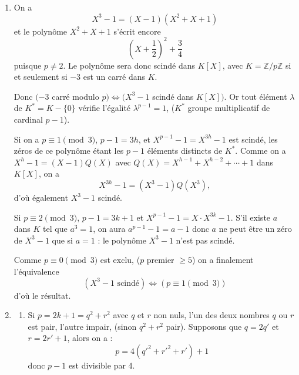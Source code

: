 \begin{enumerate}[label=\arabic*.,leftmargin=2.2em,itemsep=1.15em]
Soit $f\in I$. Si $f$ ne s'annule pas, la fonction $g=1/f$ est continue sur $[0,1]$, donc $1/f\in E$, $f\in I\Rightarrow1\in I$ et alors, $\forall g\in E$, $g=1\cdot g\in I$, c'est exclu. Donc chaque $f$ de $I$ s'annule. Soit
\[
N(f)=\{x\in[0,1],f(x)=0\}.
\]
Soient $f_1,\ldots,f_p$ dans $I$, les fonctions conjuguées $\overline{f_k}$ sont dans $E$ donc les produits $\overline{f_k}f_k=|f_k|^2$ sont dans l'idéal $I$ et les sommes
\[
\sum_{k=1}^p|f_k|^2
\]
sont dans $I$, donc $\sum_{k=1}^p|f_k|^2$ s'annule mais ceci n'est possible qu'en un $x_0$ zéro commun de $f_1,\ldots,f_p$. Donc, pour toute partie finie de $I$, les fonctions de cette partie ont un zéro commun.

Soit alors
\[
A=\bigcap_{f\in I}N(f).
\]
Si $A=\varnothing$, on a une intersection de fermés, ($f$ continue), vide, dans $[0,1]$ compact, donc il existe une intersection finie déjà vide, soit une famille finie d'éléments de $I$ sans zéro commun : c'est exclu.

Donc $\bigcap_{f\in I}N(f)\ne\varnothing$ : il y a un zéro commun aux $f$ de $I$.

\item On a
\[
X^3-1=(X-1)(X^2+X+1)
\]
et le polynôme $X^2+X+1$ s'écrit encore
\[
\left(X+\frac12\right)^2+\frac34
\]
puisque $p\ne2$. Le polynôme sera donc scindé dans $K[X]$, avec $K=\mathbb Z/p\mathbb Z$ si et seulement si $-3$ est un carré dans $K$.

Donc $(-3$ carré modulo $p)\Longleftrightarrow(X^3-1$ scindé dans $K[X])$. Or tout élément $\lambda$ de $K^*=K-\{0\}$ vérifie l'égalité $\lambda^{p-1}=1$, ($K^*$ groupe multiplicatif de cardinal $p-1$).

Si on a $p\equiv1\pmod3$, $p-1=3h$, et $X^{p-1}-1=X^{3h}-1$ est scindé, les zéros de ce polynôme étant les $p-1$ éléments distincts de $K^*$. Comme on a $X^h-1=(X-1)Q(X)$ avec $Q(X)=X^{h-1}+X^{h-2}+\cdots+1$ dans $K[X]$, on a
\[
X^{3h}-1=(X^3-1)Q(X^3),
\]
d'où également $X^3-1$ scindé.

Si $p\equiv2\pmod3$, $p-1=3k+1$ et $X^{p-1}-1=X\cdot X^{3k}-1$. S'il existe $a$ dans $K$ tel que $a^3=1$, on aura $a^{p-1}-1=a-1$ donc $a$ ne peut être un zéro de $X^3-1$ que si $a=1$ : le polynôme $X^3-1$ n'est pas scindé.

Comme $p\equiv0\pmod3$ est exclu, ($p$ premier $\ge5$) on a finalement l'équivalence
\[
(X^3-1\text{ scindé})\Longleftrightarrow(p\equiv1\pmod3)
\]
d'où le résultat.

\item
\begin{enumerate}[label=\alph*),leftmargin=2em]
\item Si $p=2k+1=q^2+r^2$ avec $q$ et $r$ non nuls, l'un des deux nombres $q$ ou $r$ est pair, l'autre impair, (sinon $q^2+r^2$ pair). Supposons que $q=2q'$ et $r=2r'+1$, alors on a :
\[
p=4(q'^2+r'^2+r')+1
\]
donc $p-1$ est divisible par 4.


\end{enumerate}
\end{enumerate}
